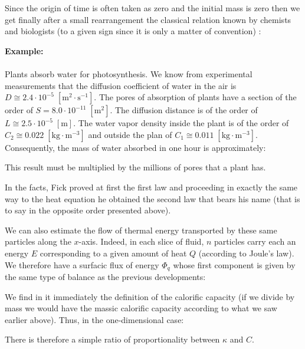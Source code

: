 	Since the origin of time is often taken as zero and the initial mass is zero then we get finally after a small rearrangement the classical relation known by chemists and biologists (to a given sign since it is only a matter of convention) :	
	
	
	\pagebreak
	\begin{tcolorbox}[colframe=black,colback=white,sharp corners]
	\textbf{{\Large {}}Example:}\\\\
	Plants absorb water for photosynthesis. We know from experimental measurements that the diffusion coefficient of water in the air is $D\cong 2.4\cdot 10^{-5}\;[\text{m}^2\cdot \text{s}^{-1}]$. The pores of absorption of plants have a section of the order of $S=8.0\cdot 10^{-11}\;[\text{m}^2]$. The diffusion distance is of the order of $L\cong 2.5\cdot 10^{-5}\;[\text{m}]$. The water vapor density inside the plant is of the order of $C_2\cong 0.022\;[\text{kg}\cdot \text{m}^{-3}]$ and outside the plan of $C_1\cong 0.011\;[\text{kg}\cdot \text{m}^{-3}]$. \\
	
	Consequently, the mass of water absorbed in one hour is approximately:
	
	This result must be multiplied by the millions of pores that a plant has.
	\end{tcolorbox}
	\begin{tcolorbox}[title=Remark,colframe=black,arc=10pt]
	In the facts, Fick proved at first the first law and proceeding in exactly the same way to the heat equation he obtained the second law that bears his name (that is to say in the opposite order presented above).
	\end{tcolorbox}
	We can also estimate the flow of thermal energy transported by these same particles along the $x$-axis. Indeed, in each slice of fluid, $n$ particles carry each an energy $E$ corresponding to a given amount of heat $Q$ (according to Joule's law). We therefore have a surfacic flux of energy $\Phi_q$ whose first component is given by the same type of balance as the previous developments:
	
	We find in it immediately the definition of the calorific capacity (if we divide by mass we would have the massic calorific capacity according to what we saw earlier above). Thus, in the one-dimensional case:
	
	There is therefore a simple ratio of proportionality between $\kappa$ and $C$.
	
	
